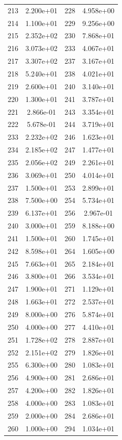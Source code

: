 \documentclass[12pt]{article}
\begin{document}
\begin{longtable}{@{}cccc@{}}
213 & 2.200e+01 & 228 & 4.958e+00 \\
214 & 1.100e+01 & 229 & 9.256e+00 \\
215 & 2.352e+02 & 230 & 7.868e+01 \\
216 & 3.073e+02 & 233 & 4.067e+01 \\
217 & 3.307e+02 & 237 & 3.167e+01 \\
218 & 5.240e+01 & 238 & 4.021e+01 \\
219 & 2.600e+01 & 240 & 3.140e+01 \\
220 & 1.300e+01 & 241 & 3.787e+01 \\
221 & 2.866e-01 & 243 & 3.354e+01 \\
222 & 5.678e-01 & 244 & 3.719e+01 \\
233 & 2.232e+02 & 246 & 1.623e+01 \\
234 & 2.185e+02 & 247 & 1.477e+01 \\
235 & 2.056e+02 & 249 & 2.261e+01 \\
236 & 3.069e+01 & 250 & 4.014e+01 \\
237 & 1.500e+01 & 253 & 2.899e+01 \\
238 & 7.500e+00 & 254 & 5.734e+01 \\
239 & 6.137e+01 & 256 & 2.967e-01 \\
240 & 3.000e+01 & 259 & 8.188e+00 \\
241 & 1.500e+01 & 260 & 1.745e+01 \\
242 & 8.598e+01 & 264 & 1.605e+00 \\
245 & 7.663e+01 & 265 & 2.184e+01 \\
246 & 3.800e+01 & 266 & 3.534e+01 \\
247 & 1.900e+01 & 271 & 1.129e+01 \\
248 & 1.663e+01 & 272 & 2.537e+01 \\
249 & 8.000e+00 & 276 & 5.874e+01 \\
250 & 4.000e+00 & 277 & 4.410e+01 \\
251 & 1.728e+02 & 278 & 2.887e+01 \\
252 & 2.151e+02 & 279 & 1.826e+01 \\
255 & 6.300e+00 & 280 & 1.083e+01 \\
256 & 4.900e+00 & 281 & 2.686e+01 \\
257 & 4.200e+00 & 282 & 1.826e+01 \\
258 & 4.000e+00 & 283 & 1.083e+01 \\
259 & 2.000e+00 & 284 & 2.686e+01 \\
260 & 1.000e+00 & 294 & 1.034e+01 \\

\end{longtable}
\end{document}
